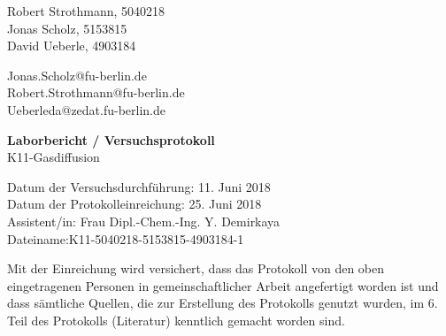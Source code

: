 
\thispagestyle{empty}

\begin{flushleft}
Robert Strothmann, 5040218\\ 
Jonas Scholz, 5153815\\ 
David Ueberle, 4903184\\ 
\end{flushleft}
\vspace*{0.3cm}
Jonas.Scholz@fu-berlin.de\\
Robert.Strothmann@fu-berlin.de\\
Ueberleda@zedat.fu-berlin.de\\
\begin{center}
	\vspace*{1cm}
	\Large
	{ \bfseries Laborbericht / Versuchsprotokoll}\\
	\vspace*{1cm}
	{K11-Gasdiffusion}\\
\end{center}
	\vspace*{1cm}
	{Datum der Versuchsdurchführung: 11. Juni 2018}\\
	{Datum der Protokolleinreichung:  25. Juni 2018}\\
	{Assistent/in: Frau Dipl.-Chem.-Ing. Y. Demirkaya}\\
	{Dateiname:K11-5040218-5153815-4903184-1}	
	\vfill
\begin{flushleft}
Mit der Einreichung wird versichert, dass das Protokoll von den oben eingetragenen Personen in gemeinschaftlicher Arbeit angefertigt worden ist und dass sämtliche Quellen, die zur Erstellung des Protokolls genutzt wurden, im 6. Teil des Protokolls (Literatur) kenntlich gemacht worden sind.
\end{flushleft}

\normalsize
\newpage
%